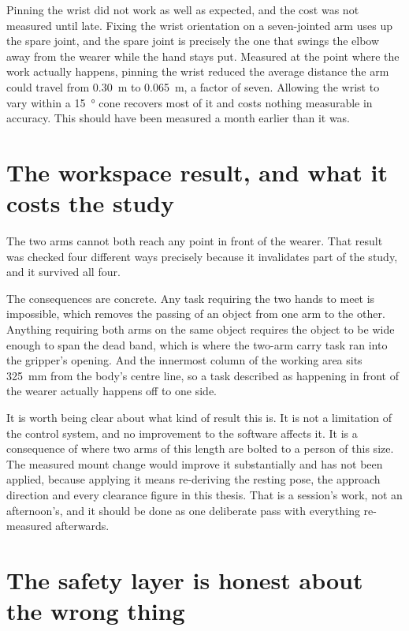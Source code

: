 Pinning the wrist did not work as well as expected, and the cost was not
measured until late. Fixing the wrist orientation on a seven-jointed arm uses
up the spare joint, and the spare joint is precisely the one that swings the
elbow away from the wearer while the hand stays put. Measured at the point
where the work actually happens, pinning the wrist reduced the average
distance the arm could travel from \SI{0.30}{\metre} to \SI{0.065}{\metre}, a
factor of seven. Allowing the wrist to vary within a \SI{15}{\degree} cone
recovers most of it and costs nothing measurable in accuracy. This should have
been measured a month earlier than it was.

\section{The workspace result, and what it costs the study}

The two arms cannot both reach any point in front of the wearer. That result
was checked four different ways precisely because it invalidates part of the
study, and it survived all four.

The consequences are concrete. Any task requiring the two hands to meet is
impossible, which removes the passing of an object from one arm to the other.
Anything requiring both arms on the same object requires the object to be wide
enough to span the dead band, which is where the two-arm carry task ran into
the gripper's opening. And the innermost column of the working area sits
\SI{325}{\milli\metre} from the body's centre line, so a task described as
happening in front of the wearer actually happens off to one side.

It is worth being clear about what kind of result this is. It is not a
limitation of the control system, and no improvement to the software affects
it. It is a consequence of where two arms of this length are bolted to a
person of this size. The measured mount change would improve it substantially
and has not been applied, because applying it means re-deriving the resting
pose, the approach direction and every clearance figure in this thesis. That
is a session's work, not an afternoon's, and it should be done as one
deliberate pass with everything re-measured afterwards.

\section{The safety layer is honest about the wrong thing}

